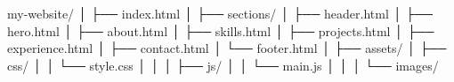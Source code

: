 my-website/
│
├── index.html
│
├── sections/
│   ├── header.html
│   ├── hero.html
│   ├── about.html
│   ├── skills.html
│   ├── projects.html
│   ├── experience.html
│   ├── contact.html
│   └── footer.html
│
├── assets/
│   ├── css/
│   │   └── style.css
│   │
│   ├── js/
│   │   └── main.js
│   │
│   └── images/